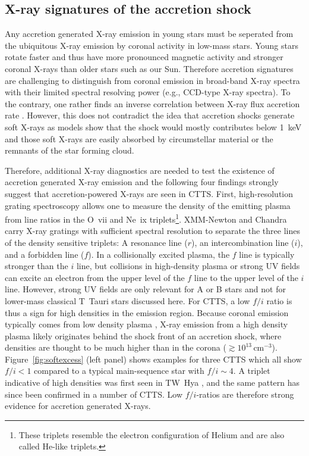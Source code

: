 \subsection{X-ray signatures of the accretion shock}
\label{sect:accretionobs}
Any accretion generated X-ray emission in young stars must be seperated from the ubiquitous X-ray emission by coronal activity in low-mass stars. Young stars rotate faster and thus have more pronounced magnetic activity and stronger coronal X-rays than older stars such as our Sun. Therefore accretion signatures are challenging to distinguish from coronal emission in broad-band X-ray spectra with their limited spectral resolving power (e.g., CCD-type X-ray spectra). To the contrary, one rather finds an inverse correlation between X-ray flux  accretion rate \cite{2005ApJS..160..401P, Schneider_2018}. However, this does not contradict the idea that accretion shocks generate soft X-rays as models show that the shock would mostly contributes below 1~keV \cite{1999AstL...25..430L} and those soft X-rays are easily absorbed by circumstellar material or the remnants of the star forming cloud.

Therefore, additional X-ray diagnostics are needed to test the existence of accretion generated X-ray emission and the following four findings strongly suggest that accretion-powered X-rays are seen in CTTS. First, high-resolution grating spectroscopy allows one to measure the density of the emitting plasma from line ratios in the O~{\sc vii} and Ne~{\sc ix} triplets\footnote{These triplets resemble the electron configuration of Helium and are also called He-like triplets.}. XMM-Newton and Chandra carry X-ray gratings with sufficient spectral resolution to separate the three lines of the density sensitive triplets: A resonance line ($r$), an intercombination line ($i$), and a forbidden line ($f$). In a collisionally excited plasma, the $f$ line is typically stronger than the $i$ line, but collisions in high-density plasma or strong UV fields can excite an electron from the upper level of the $f$ line to the upper level of the $i$ line. However, strong UV fields are only relevant for A or B stars and not for lower-mass classical T~Tauri stars discussed here. For CTTS, a low $f/i$ ratio is thus a sign for high densities in the emission region. Because coronal emission typically comes from low density plasma \citep[$n_e\lesssim10^{10}$\,cm$^{-3}$, e.g.,][]{Ness_2002}, X-ray emission from a high density plasma likely originates behind the shock front of an accretion shock, where densities are thought to be much higher than in the corona ($\gtrsim10^{13}$\,cm$^{-3}$). Figure~\ref{fig:softexcess} (left panel) shows examples for three CTTS which all show $f/i < 1$ compared to a typical main-sequence star with $f/i\sim 4$. A triplet indicative of high densities was first seen in TW~Hya \cite{Kastner_2002}, and the same pattern has since been confirmed in a number of CTTS. Low $f/i$-ratios are therefore strong evidence for accretion generated X-rays.

